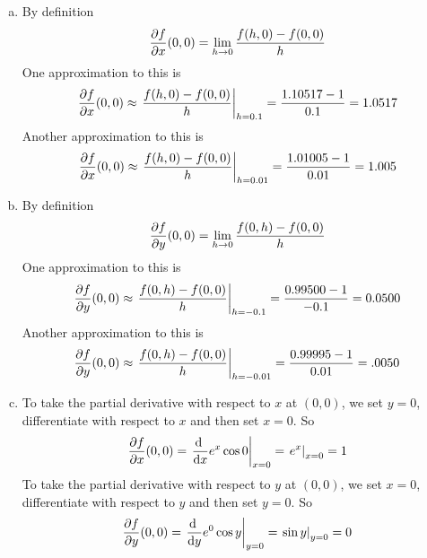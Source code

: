 \begin{solution}
\begin{enumerate}[(a)]
\item
By definition
\begin{equation*}
\pdiff{f}{x}(0,0)
=\lim_{h\rightarrow 0}\frac{f(h,0)-f(0,0)}{h}
\end{equation*}
One approximation to this is
\begin{align*}
\pdiff{f}{x}(0,0)
\approx \left.\frac{f(h,0)-f(0,0)}{h}\right|_{h=0.1}
=\frac{1.10517-1}{0.1}
=1.0517
\end{align*}
Another approximation to this is
\begin{align*}
\pdiff{f}{x}(0,0)
\approx \left.\frac{f(h,0)-f(0,0)}{h}\right|_{h=0.01}
=\frac{1.01005-1}{0.01}
=1.005
\end{align*}
\item
By definition
\begin{equation*}
\pdiff{f}{y}(0,0)
=\lim_{h\rightarrow 0}\frac{f(0,h)-f(0,0)}{h}
\end{equation*}
One approximation to this is
\begin{align*}
\pdiff{f}{y}(0,0)
\approx \left.\frac{f(0,h)-f(0,0)}{h}\right|_{h=-0.1}
=\frac{0.99500-1}{-0.1}
=0.0500
\end{align*}
Another approximation to this is
\begin{align*}
\pdiff{f}{y}(0,0)
\approx \left.\frac{f(0,h)-f(0,0)}{h}\right|_{h=-0.01}
=\frac{0.99995-1}{0.01}
=.0050
\end{align*}
\item
To take the partial derivative with respect to $x$ at $(0,0)$,
we set $y=0$, differentiate with respect to $x$ and then set $x=0$. So
\begin{align*}
\pdiff{f}{x}(0,0) = \left.\diff{}{x} e^x\cos 0\right|_{x=0}
=\left.e^x\right|_{x=0}=1
\end{align*}
To take the partial derivative with respect to $y$ at $(0,0)$,
we set $x=0$, differentiate with respect to $y$ and then set $y=0$. So
\begin{align*}
\pdiff{f}{y}(0,0) = \left.\diff{}{y} e^0\cos y\right|_{y=0}
=\left.\sin y\right|_{y=0}
=0
\end{align*}
\end{enumerate}
\end{solution}

